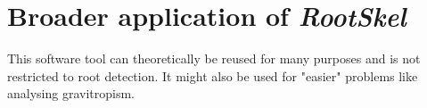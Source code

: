 \section{Broader application of \textit{RootSkel}}

This software tool can theoretically be reused for many purposes and is not restricted to root detection.
It might also be used for "easier" problems like analysing gravitropism.


